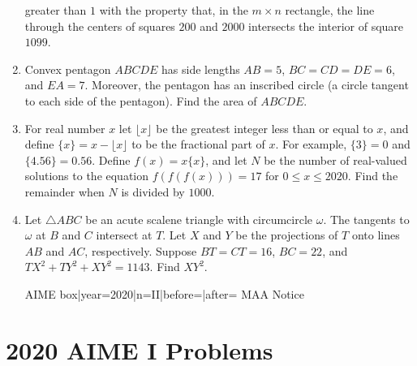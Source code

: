 \documentclass{article}
\begin{document}
\begin{enumerate}[label=\arabic*., itemsep=0.5em]
greater than \(1\) with the property that, in the \(m\times n\) rectangle, the line through the centers of squares \(200\) and \(2000\) intersects the interior of square \(1099\).\par \vspace{0.5em}\item Convex pentagon \(ABCDE\) has side lengths \(AB=5\), \(BC=CD=DE=6\), and \(EA=7\). Moreover, the pentagon has an inscribed circle (a circle tangent to each side of the pentagon). Find the area of \(ABCDE\).\par \vspace{0.5em}\item For real number \(x\) let \(\lfloor x\rfloor\) be the greatest integer less than or equal to \(x\), and define \(\{x\} = x - \lfloor x \rfloor\) to be the fractional part of \(x\). For example, \(\{3\} = 0\) and \(\{4.56\} = 0.56\). Define \(f(x)=x\{x\}\), and let \(N\) be the number of real-valued solutions to the equation \(f(f(f(x)))=17\) for \(0\leq x\leq 2020\). Find the remainder when \(N\) is divided by \(1000\).\par \vspace{0.5em}\item Let \(\triangle ABC\) be an acute scalene triangle with circumcircle \(\omega\). The tangents to \(\omega\) at \(B\) and \(C\) intersect at \(T\). Let \(X\) and \(Y\) be the projections of \(T\) onto lines \(AB\) and \(AC\), respectively. Suppose \(BT = CT = 16\), \(BC = 22\), and \(TX^2 + TY^2 + XY^2 = 1143\). Find \(XY^2\).



{{AIME box|year=2020|n=II|before=|after=}}
{{MAA Notice}}\par \vspace{0.5em}\end{enumerate}\newpage\section*{2020 AIME I Problems}
\end{document}
